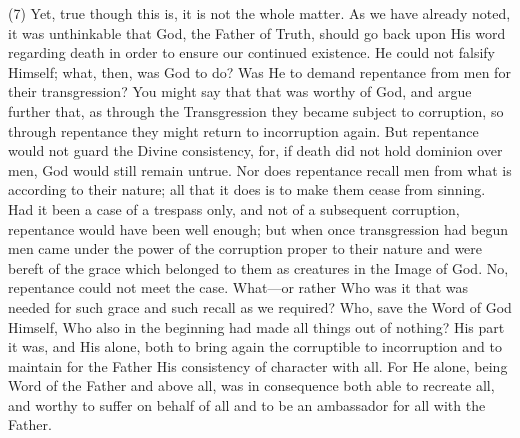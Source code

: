 \documentclass[9pt, twocolumn, oneside, a4paper]{memoir}
\begin{document}
\textsc{(7)} Yet, true though this is, it is not the whole       matter. As we have already       noted, it was unthinkable that God, the Father of       Truth, should go back upon His word regarding death in order to ensure our       continued existence. He could not falsify Himself; what, then, was God to do?       Was He to demand repentance from men for their transgression? You might say that       that was worthy of God, and argue further that, as through the Transgression       they became subject to corruption, so through repentance they might return to       incorruption again. But repentance would not guard the Divine consistency, for,       if death did not hold dominion over men, God would still remain untrue. Nor does       repentance recall men from what is according to their nature; all that it does       is to make them cease from sinning. Had it been a case of a trespass only, and       not of a subsequent corruption, repentance would have been well enough; but when       once transgression had begun men came under the power of the corruption proper       to their nature and were bereft of the grace which belonged to them as creatures       in the Image of God. No, repentance could not meet the case. What—or rather Who       was it that was needed for such grace and such recall as we required? Who, save       the Word of God Himself, Who also in the beginning had made all things out of       nothing? His part it was, and His alone, both to bring again the corruptible to       incorruption and to maintain for the Father His consistency of character with       all. For He alone, being Word of the Father and above all, was in consequence       both able to recreate all, and worthy to suffer on behalf of all and to be an       ambassador for all with the Father.   
\end{document}
